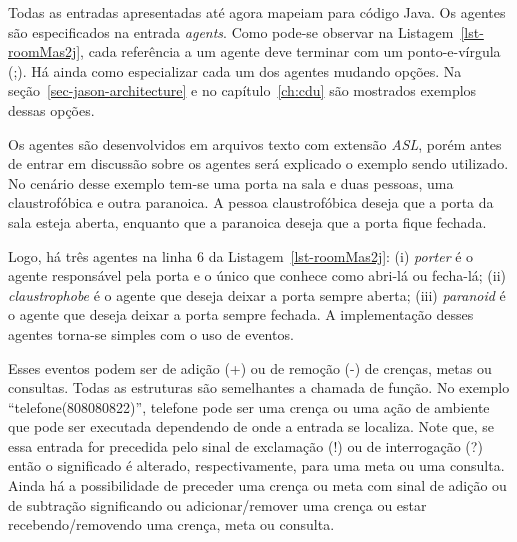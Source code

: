Todas as entradas apresentadas até agora mapeiam para código Java.
Os agentes são especificados na entrada \emph{agents}. Como pode-se
observar na Listagem~\ref{lst-roomMas2j}, cada referência a um agente deve
terminar com um ponto-e-vírgula (;). Há ainda como especializar cada um dos
agentes mudando opções. Na seção~\ref{sec-jason-architecture} e no
capítulo~\ref{ch:cdu} são mostrados exemplos dessas opções.

Os agentes são desenvolvidos em arquivos texto com extensão \emph{ASL}, porém
antes de entrar em discussão sobre os agentes será explicado o exemplo sendo
utilizado. No cenário desse exemplo tem-se uma porta na sala e duas pessoas, uma
claustrofóbica e outra paranoica. A pessoa claustrofóbica deseja que a
porta da sala esteja aberta, enquanto que a paranoica deseja que a porta
fique fechada.

Logo, há três agentes na linha 6 da Listagem~\ref{lst-roomMas2j}:
(i) \emph{porter} é o agente responsável pela porta e o único que conhece
como abri-lá ou fecha-lá;
(ii) \emph{claustrophobe} é o agente que deseja deixar a porta sempre aberta;
(iii) \emph{paranoid} é o agente que deseja deixar a porta sempre fechada.
A implementação desses agentes torna-se simples com o uso de eventos.

Esses eventos podem ser de adição (+) ou de remoção (-) de crenças, metas ou
consultas. Todas as estruturas são semelhantes a chamada de função. No
exemplo ``telefone(808080822)'', telefone pode ser uma crença ou uma ação de
ambiente que pode ser executada dependendo de onde a entrada se localiza.
Note que, se essa entrada for precedida pelo sinal de exclamação (!) ou de
interrogação (?) então o significado é alterado, respectivamente, para uma meta
ou uma consulta. Ainda há a possibilidade de preceder uma crença ou meta
com sinal de adição ou de subtração significando ou adicionar/remover uma
crença ou estar recebendo/removendo uma crença, meta ou consulta.

